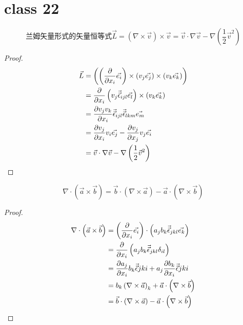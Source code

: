 \section{class 22}
\begin{proposition}
\[
\text{兰姆矢量形式的矢量恒等式}\vec{L}=\left(\nabla\times\vec{v}\right)\times\vec{v}
=\vec{v}\cdot\nabla\vec{v}-\nabla\left(\frac{1}{2}\vec{v}^2\right)
\]
\begin{proof}
    \begin{align*}
        \vec{L}&=\left(\left(\frac{\partial}{\partial x_i}\vec{e_i}\right)\times
        \left(v_j\vec{e_j}\right)\times\left(v_k\vec{e_k}\right)\right)\\
        &=\frac{\partial}{\partial x_i}\left(v_j\vec{\vec{\epsilon}}_{ijl}\vec{e_l}\right)\times\left(v_k\vec{e_k}\right)\\
        &=\frac{\partial v_jv_k}{\partial x_i}\vec{\vec{\epsilon}}_{ijl}\vec{\vec{\epsilon}}_{lkm}\vec{e_m}\\
        &=\frac{\partial v_j}{\partial x_i}v_i\vec{e_j}-\frac{\partial v_j}{\partial x_j}v_j\vec{e_i}\\
        &=\vec{v}\cdot\nabla\vec{v}-\nabla\left(\frac{1}{2}\vec{v}^2\right)
    \end{align*}
\end{proof}
\end{proposition}
\begin{proposition}
    \[
    \nabla\cdot\left(\vec{a}\times\vec{b}\right)
    =\vec{b}\cdot\left(\nabla\times\vec{a}\right)-\vec{a}\cdot\left(\nabla\times\vec{b}\right)
    \]
    \begin{proof}
        \begin{align*}
            \nabla\cdot\left(\vec{a}\times\vec{b}\right)
            &=\left(\frac{\partial}{\partial x_i}\vec{e_i}\right)\cdot
            \left(a_jb_k\vec{\vec{\epsilon}}_{jkl}\vec{e_k}\right)\\
            &=\frac{\partial}{\partial x_i}\left(a_jb_k\vec{\vec{\epsilon}}_{jkl}\delta_{il}\right)\\
            &=\frac{\partial a_j}{\partial x_i}b_k\vec{\vec{\epsilon}}{jki}+a_j\frac{\partial b_k}{\partial x_i}\vec{\vec{\epsilon}}{jki}\\
            &=b_k \left( \nabla \times \vec{a} \right)_k +\vec{a} \cdot \left( \nabla \times \vec{b} \right)\\
            &=\vec{b}\cdot\left(\nabla\times\vec{a}\right)-\vec{a}\cdot\left(\nabla\times\vec{b}\right)
        \end{align*}
    \end{proof}
\end{proposition}
